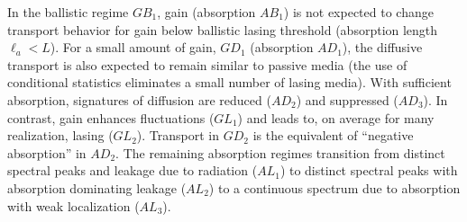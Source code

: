 In the ballistic regime $GB_1$, gain (absorption $AB_1$) is not expected to change transport behavior for gain below ballistic lasing threshold (absorption length $\ell_a < L$). For a small amount of gain, $GD_1$ (absorption $AD_1$), the diffusive transport is also expected to remain similar to passive media (the use of conditional statistics\cite{2005_Yamilov_correlations} eliminates a small number of lasing media). With sufficient absorption, signatures of diffusion are reduced ($AD_2$) and suppressed ($AD_3$). In contrast, gain enhances fluctuations ($GL_1$) and leads to, on average for many realization, lasing ($GL_2$)\cite{1968_Letokhov}. Transport in $GD_2$ is the equivalent of ``negative absorption'' in $AD_2$. The remaining absorption regimes transition from distinct spectral peaks and leakage due to radiation ($AL_1$) to distinct spectral peaks with absorption dominating leakage ($AL_2$) to a continuous spectrum due to absorption with weak localization ($AL_3$).

